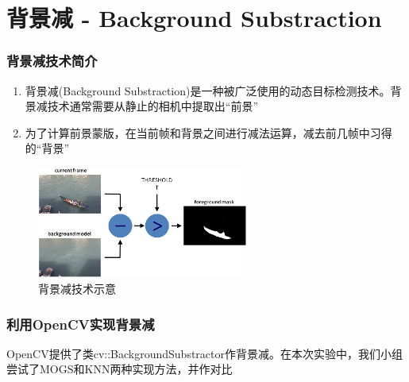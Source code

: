 \section{背景减 - Background Substraction}

\begin{frame}
    \frametitle{背景减技术简介}

    \begin{enumerate}
        \item 背景减(Background Substraction)是一种被广泛使用的动态目标检测技术。背景减技术通常需要从静止的相机中提取出``前景''
        \item 为了计算前景蒙版，在当前帧和背景之间进行减法运算，减去前几帧中习得的``背景''
    \end{enumerate}

    \begin{figure}
        \includegraphics[width=0.618\textwidth]{images/Background_Subtraction_Tutorial_Scheme.png}
        \caption{背景减技术示意}
    \end{figure}

\end{frame}


\begin{frame}
    \frametitle{利用OpenCV实现背景减}

    OpenCV提供了类cv::BackgroundSubstractor作背景减。在本次实验中，我们小组尝试了MOGS和KNN两种实现方法，并作对比
\end{frame}